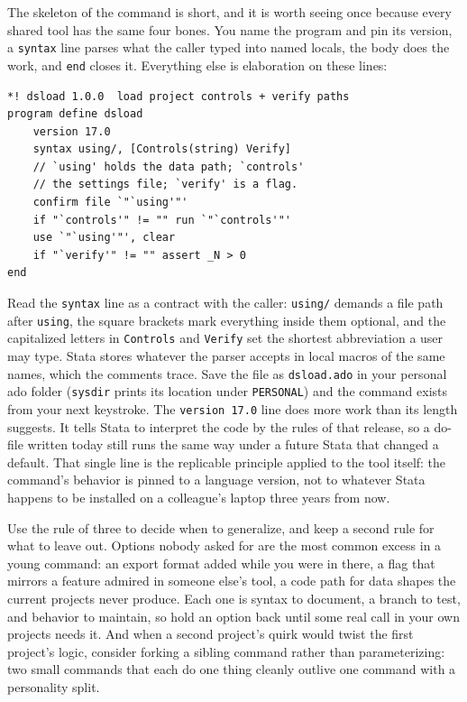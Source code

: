 \documentclass[
    a4paper,
    fontsize=10pt,
    twoside=true,
    numbers=noenddot,
]{kaobook}
\begin{document}
The skeleton of the command is short, and it is worth seeing once because every shared tool has the same four bones. You name the program and pin its version, a \texttt{syntax} line parses what the caller typed into named locals, the body does the work, and \texttt{end} closes it. Everything else is elaboration on these lines:
\par
{\footnotesize
\begin{verbatim}
*! dsload 1.0.0  load project controls + verify paths
program define dsload
    version 17.0
    syntax using/, [Controls(string) Verify]
    // `using' holds the data path; `controls'
    // the settings file; `verify' is a flag.
    confirm file `"`using'"'
    if "`controls'" != "" run `"`controls'"'
    use `"`using'"', clear
    if "`verify'" != "" assert _N > 0
end
\end{verbatim}
}
Read the \texttt{syntax} line as a contract with the caller: \texttt{using/} demands a file path after \texttt{using}, the square brackets mark everything inside them optional, and the capitalized letters in \texttt{Controls} and \texttt{Verify} set the shortest abbreviation a user may type. Stata stores whatever the parser accepts in local macros of the same names, which the comments trace. Save the file as \texttt{dsload.ado} in your personal ado folder (\texttt{sysdir} prints its location under \texttt{PERSONAL}) and the command exists from your next keystroke.
The \texttt{version 17.0} line does more work than its length suggests. It tells Stata to interpret the code by the rules of that release, so a do-file written today still runs the same way under a future Stata that changed a default. That single line is the replicable principle applied to the tool itself: the command's behavior is pinned to a language version, not to whatever Stata happens to be installed on a colleague's laptop three years from now.

Use the rule of three to decide when to generalize, and keep a second rule for what to leave out. Options nobody asked for are the most common excess in a young command: an export format added while you were in there, a flag that mirrors a feature admired in someone else's tool, a code path for data shapes the current projects never produce. Each one is syntax to document, a branch to test, and behavior to maintain, so hold an option back until some real call in your own projects needs it. And when a second project's quirk would twist the first project's logic, consider forking a sibling command rather than parameterizing: two small commands that each do one thing cleanly outlive one command with a personality split.
\end{document}
